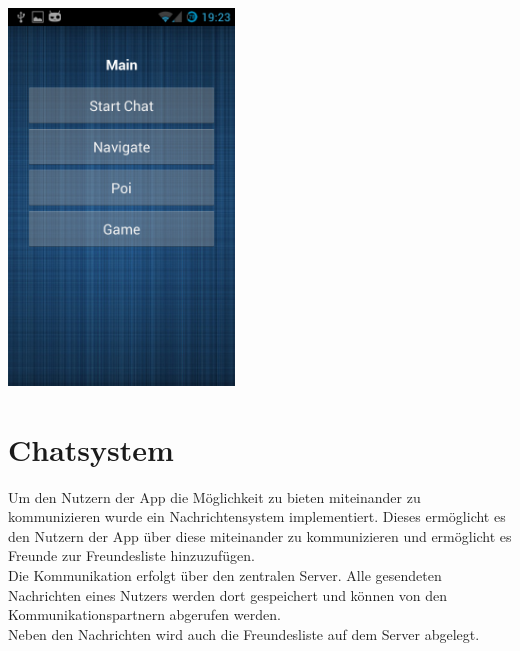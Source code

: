 \begin{capfigure}
	\includegraphics[width=6cm]{images/app/main_menu}
\end{capfigure}

\section{Chatsystem}
Um den Nutzern der App die Möglichkeit zu bieten miteinander zu kommunizieren wurde ein Nachrichtensystem implementiert. Dieses ermöglicht es den Nutzern der App über diese miteinander zu kommunizieren und ermöglicht es Freunde zur Freundesliste hinzuzufügen.\\
Die Kommunikation erfolgt über den zentralen Server. Alle gesendeten Nachrichten eines Nutzers werden dort gespeichert und können von den Kommunikationspartnern abgerufen werden. \\
Neben den Nachrichten wird auch die Freundesliste auf dem Server abgelegt.

